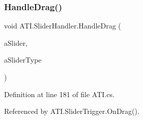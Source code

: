 \subsubsection{\texorpdfstring{Handle\+Drag()}{HandleDrag()}}
{\footnotesize\ttfamily void A\+T\+I.\+Slider\+Handler.\+Handle\+Drag (\begin{DoxyParamCaption}\item[{Slider}]{a\+Slider,  }\item[{\hyperlink{class_a_t_i_ac4c6056a99cbd16ff0d292d33b038b9b}{Slider\+Type}}]{a\+Slider\+Type }\end{DoxyParamCaption})}



Definition at line 181 of file A\+T\+I.\+cs.



Referenced by A\+T\+I.\+Slider\+Trigger.\+On\+Drag().


